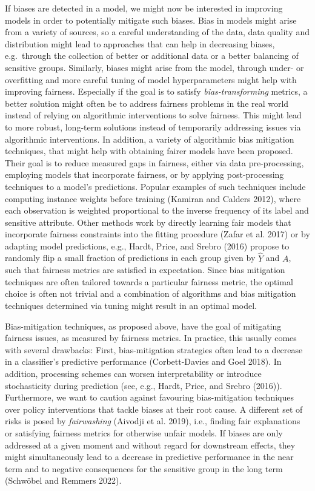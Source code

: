 If biases are detected in a model, we might now be interested in improving models in order to potentially mitigate such biases.
Bias in models might arise from a variety of sources, so a careful understanding of the data, data quality and distribution might lead to approaches that can help in decreasing biases, e.g.~through the collection of better or additional data or a better balancing of sensitive groups.
Similarly, biases might arise from the model, through under- or overfitting and more careful tuning of model hyperparameters might help with improving fairness.
Especially if the goal is to satisfy \emph{bias-transforming} metrics, a better solution might often be to address fairness problems in the real world instead of relying on algorithmic interventions to solve fairness. This might lead to more robust, long-term solutions instead of temporarily addressing issues via algorithmic interventions.
In addition, a variety of algorithmic bias mitigation techniques, that might help with obtaining fairer models have been proposed.
Their goal is to reduce measured gaps in fairness, either via data pre-processing, employing models that incorporate fairness, or by applying post-processing techniques to a model's predictions.
Popular examples of such techniques include computing instance weights before training (Kamiran and Calders 2012), where each observation is weighted proportional to the inverse frequency of its label and sensitive attribute.
Other methods work by directly learning fair models that incorporate fairness constraints into the fitting procedure (Zafar et al. 2017) or by adapting model predictions, e.g., Hardt, Price, and Srebro (2016) propose to randomly flip a small fraction of predictions in each group given by \(\hat{Y}\) and \(A\), such that fairness metrics are satisfied in expectation.
Since bias mitigation techniques are often tailored towards a particular fairness metric, the optimal choice is often not trivial and a combination of algorithms and bias mitigation techniques determined via tuning might result in an optimal model.

Bias-mitigation techniques, as proposed above, have the goal of mitigating fairness issues, as measured by fairness metrics.
In practice, this usually comes with several drawbacks:
First, bias-mitigation strategies often lead to a decrease in a classifier's predictive performance (Corbett-Davies and Goel 2018).
In addition, processing schemes can worsen interpretability or introduce stochasticity during prediction (see, e.g., Hardt, Price, and Srebro (2016)).
Furthermore, we want to caution against favouring bias-mitigation techniques over policy interventions that tackle biases at their root cause.
A different set of risks is posed by \emph{fairwashing} (Aivodji et al. 2019), i.e., finding fair explanations or satisfying fairness metrics for otherwise unfair models.
If biases are only addressed at a given moment and without regard for downstream effects, they might simultaneously lead to a decrease in predictive performance in the near term and to negative consequences for the sensitive group in the long term (Schwöbel and Remmers 2022).

